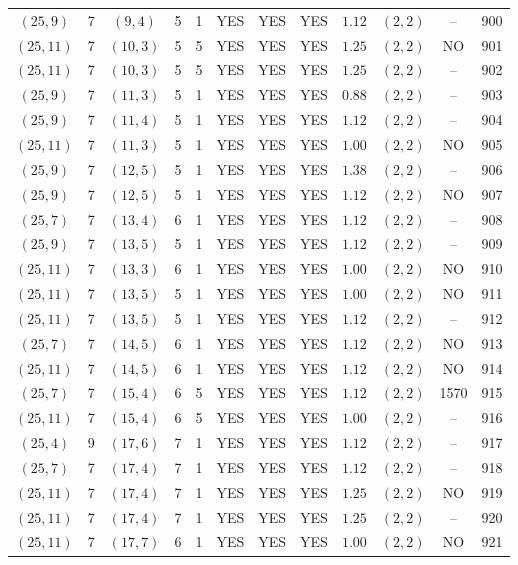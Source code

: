 \begin{longtable}{|c|c|c|c|c|c|c|c|c|c|c|c|}
$(25,9)$ & 7 & $(9,4)$ & 5 & 1 & YES & YES & YES & $1.12$ & $(2,2)$ & -- & 900\\
$(25,11)$ & 7 & $(10,3)$ & 5 & 5 & YES & YES & YES & $1.25$ & $(2,2)$ & NO & 901\\
$(25,11)$ & 7 & $(10,3)$ & 5 & 5 & YES & YES & YES & $1.25$ & $(2,2)$ & -- & 902\\
$(25,9)$ & 7 & $(11,3)$ & 5 & 1 & YES & YES & YES & $0.88$ & $(2,2)$ & -- & 903\\
$(25,9)$ & 7 & $(11,4)$ & 5 & 1 & YES & YES & YES & $1.12$ & $(2,2)$ & -- & 904\\
$(25,11)$ & 7 & $(11,3)$ & 5 & 1 & YES & YES & YES & $1.00$ & $(2,2)$ & NO & 905\\
$(25,9)$ & 7 & $(12,5)$ & 5 & 1 & YES & YES & YES & $1.38$ & $(2,2)$ & -- & 906\\
$(25,9)$ & 7 & $(12,5)$ & 5 & 1 & YES & YES & YES & $1.12$ & $(2,2)$ & NO & 907\\
$(25,7)$ & 7 & $(13,4)$ & 6 & 1 & YES & YES & YES & $1.12$ & $(2,2)$ & -- & 908\\
$(25,9)$ & 7 & $(13,5)$ & 5 & 1 & YES & YES & YES & $1.12$ & $(2,2)$ & -- & 909\\
$(25,11)$ & 7 & $(13,3)$ & 6 & 1 & YES & YES & YES & $1.00$ & $(2,2)$ & NO & 910\\
$(25,11)$ & 7 & $(13,5)$ & 5 & 1 & YES & YES & YES & $1.00$ & $(2,2)$ & NO & 911\\
$(25,11)$ & 7 & $(13,5)$ & 5 & 1 & YES & YES & YES & $1.12$ & $(2,2)$ & -- & 912\\
$(25,7)$ & 7 & $(14,5)$ & 6 & 1 & YES & YES & YES & $1.12$ & $(2,2)$ & NO & 913\\
$(25,11)$ & 7 & $(14,5)$ & 6 & 1 & YES & YES & YES & $1.12$ & $(2,2)$ & NO & 914\\
$(25,7)$ & 7 & $(15,4)$ & 6 & 5 & YES & YES & YES & $1.12$ & $(2,2)$ & 1570 & 915\\
$(25,11)$ & 7 & $(15,4)$ & 6 & 5 & YES & YES & YES & $1.00$ & $(2,2)$ & -- & 916\\
$(25,4)$ & 9 & $(17,6)$ & 7 & 1 & YES & YES & YES & $1.12$ & $(2,2)$ & -- & 917\\
$(25,7)$ & 7 & $(17,4)$ & 7 & 1 & YES & YES & YES & $1.12$ & $(2,2)$ & -- & 918\\
$(25,11)$ & 7 & $(17,4)$ & 7 & 1 & YES & YES & YES & $1.25$ & $(2,2)$ & NO & 919\\
$(25,11)$ & 7 & $(17,4)$ & 7 & 1 & YES & YES & YES & $1.25$ & $(2,2)$ & -- & 920\\
$(25,11)$ & 7 & $(17,7)$ & 6 & 1 & YES & YES & YES & $1.00$ & $(2,2)$ & NO & 921\\

\end{longtable}
